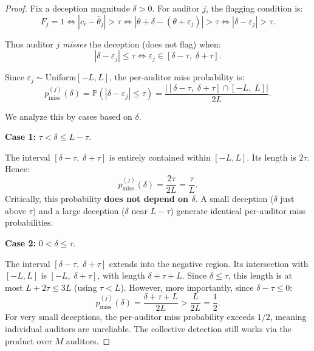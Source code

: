 \documentclass[11pt,a4paper]{article}
\theoremstyle{definition}
\theoremstyle{remark}
\newcommand{\Pbb}{\mathbb{P}}
\newcommand{\abs}[1]{\left|#1\right|}
\newcommand{\claim}{c}
\newcommand{\truth}{\theta}
\newcommand{\deception}{\delta}
\newcommand{\threshold}{\tau}
\newcommand{\tol}{L}
\begin{document}
\begin{proof}
Fix a deception magnitude $\deception > 0$. For auditor $j$, the flagging condition is:
\begin{equation}
    F_j = 1 \iff \abs{\claim_i - \hat{\theta}_j} > \threshold
          \iff \abs{\truth + \deception - (\truth + \varepsilon_j)} > \threshold
          \iff \abs{\deception - \varepsilon_j} > \threshold.
\end{equation}

Thus auditor $j$ \emph{misses} the deception (does not flag) when:
\begin{equation}
    \abs{\deception - \varepsilon_j} \leq \threshold \iff
    \varepsilon_j \in [\deception - \threshold,\; \deception + \threshold].
\end{equation}

Since $\varepsilon_j \sim \text{Uniform}[-\tol, \tol]$, the per-auditor miss probability is:
\begin{equation}
    p_{\text{miss}}^{(j)}(\deception) =
    \Pbb(\abs{\deception - \varepsilon_j} \leq \threshold) =
    \frac{\abs{[\deception - \threshold,\; \deception + \threshold] \cap [-\tol,\; \tol]}}{2\tol}.
\end{equation}

We analyze this by cases based on $\deception$.

\medskip\noindent\textbf{Case 1:} $\threshold < \deception \leq \tol - \threshold$.

The interval $[\deception - \threshold,\; \deception + \threshold]$ is entirely contained within $[-\tol, \tol]$. Its length is $2\threshold$. Hence:
\begin{equation}
    p_{\text{miss}}^{(j)}(\deception) = \frac{2\threshold}{2\tol} = \frac{\threshold}{\tol}.
    \label{eq:case1}
\end{equation}
Critically, this probability \textbf{does not depend on $\deception$}. A small deception ($\deception$ just above $\threshold$) and a large deception ($\deception$ near $\tol - \threshold$) generate identical per-auditor miss probabilities.

\medskip\noindent\textbf{Case 2:} $0 < \deception \leq \threshold$.

The interval $[\deception - \threshold,\; \deception + \threshold]$ extends into the negative region. Its intersection with $[-\tol, \tol]$ is $[-\tol,\; \deception + \threshold]$, with length $\deception + \threshold + \tol$. Since $\deception \leq \threshold$, this length is at most $\tol + 2\threshold \leq 3\tol$ (using $\threshold < \tol$). However, more importantly, since $\deception - \threshold \leq 0$:
\begin{equation}
    p_{\text{miss}}^{(j)}(\deception) = \frac{\deception + \threshold + \tol}{2\tol}
                                         > \frac{\tol}{2\tol} = \frac{1}{2}.
\end{equation}
For very small deceptions, the per-auditor miss probability exceeds $1/2$, meaning individual auditors are unreliable. The collective detection still works via the product over $M$ auditors.


\end{proof}
\end{document}
